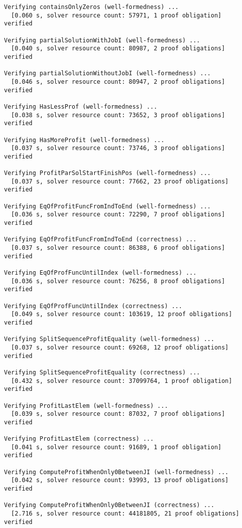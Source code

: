 \begin{Verbatim}[fontsize=\small]
Verifying containsOnlyZeros (well-formedness) ...
  [0.060 s, solver resource count: 57971, 1 proof obligation]  verified

Verifying partialSolutionWithJobI (well-formedness) ...
  [0.040 s, solver resource count: 80987, 2 proof obligations]  verified

Verifying partialSolutionWithoutJobI (well-formedness) ...
  [0.046 s, solver resource count: 80947, 2 proof obligations]  verified

Verifying HasLessProf (well-formedness) ...
  [0.038 s, solver resource count: 73652, 3 proof obligations]  verified

Verifying HasMoreProfit (well-formedness) ...
  [0.037 s, solver resource count: 73746, 3 proof obligations]  verified

Verifying ProfitParSolStartFinishPos (well-formedness) ...
  [0.037 s, solver resource count: 77662, 23 proof obligations]  verified

Verifying EqOfProfitFuncFromIndToEnd (well-formedness) ...
  [0.036 s, solver resource count: 72290, 7 proof obligations]  verified

Verifying EqOfProfitFuncFromIndToEnd (correctness) ...
  [0.037 s, solver resource count: 86388, 6 proof obligations]  verified

Verifying EqOfProfFuncUntilIndex (well-formedness) ...
  [0.036 s, solver resource count: 76256, 8 proof obligations]  verified

Verifying EqOfProfFuncUntilIndex (correctness) ...
  [0.049 s, solver resource count: 103619, 12 proof obligations]  verified

Verifying SplitSequenceProfitEquality (well-formedness) ...
  [0.037 s, solver resource count: 69268, 12 proof obligations]  verified

Verifying SplitSequenceProfitEquality (correctness) ...
  [0.432 s, solver resource count: 37099764, 1 proof obligation]  verified

Verifying ProfitLastElem (well-formedness) ...
  [0.039 s, solver resource count: 87032, 7 proof obligations]  verified

Verifying ProfitLastElem (correctness) ...
  [0.041 s, solver resource count: 91689, 1 proof obligation]  verified

Verifying ComputeProfitWhenOnly0BetweenJI (well-formedness) ...
  [0.042 s, solver resource count: 93993, 13 proof obligations]  verified

Verifying ComputeProfitWhenOnly0BetweenJI (correctness) ...
  [2.716 s, solver resource count: 44181805, 21 proof obligations]  verified


\end{Verbatim}
